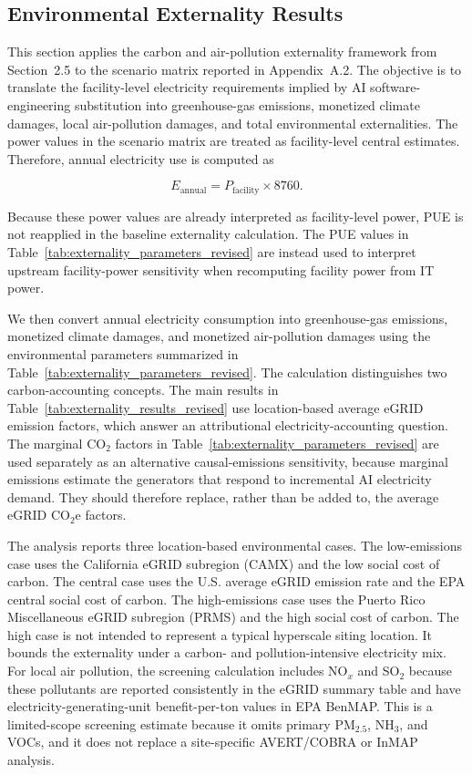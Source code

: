 \documentclass{article}
\begin{document}
\subsection{Environmental Externality Results}
\label{subsec:environmental_externality_results}

This section applies the carbon and air-pollution externality framework from Section~2.5 to the scenario matrix reported in Appendix~A.2. The objective is to translate the facility-level electricity requirements implied by AI software-engineering
substitution into greenhouse-gas emissions, monetized climate damages, local air-pollution damages, and total environmental externalities. The power values in the scenario matrix are treated as facility-level central estimates. Therefore, annual
electricity use is computed as

\begin{equation}
E_{\mathrm{annual}} = P_{\mathrm{facility}}\times 8760 .
\end{equation}

Because these power values are already interpreted as facility-level power, PUE is not reapplied in the baseline externality calculation. The PUE values in Table~\ref{tab:externality_parameters_revised} are instead used to interpret upstream facility-power sensitivity when recomputing facility power from IT power.

We then convert annual electricity consumption into greenhouse-gas emissions, monetized climate damages, and monetized air-pollution damages using the environmental parameters summarized in Table~\ref{tab:externality_parameters_revised}. The calculation distinguishes two carbon-accounting concepts. The main results in Table~\ref{tab:externality_results_revised} use location-based average eGRID emission factors, which answer an attributional electricity-accounting question. The marginal
CO$_2$ factors in Table~\ref{tab:externality_parameters_revised} are used separately as an alternative causal-emissions sensitivity, because marginal emissions estimate the generators that respond to incremental AI electricity demand. They should therefore
replace, rather than be added to, the average eGRID CO$_2$e factors.

The analysis reports three location-based environmental cases. The low-emissions case uses the California eGRID subregion (CAMX) and the low social cost of carbon. The central case uses the U.S. average eGRID emission rate and the EPA central social cost of carbon. The high-emissions case uses the Puerto Rico Miscellaneous eGRID subregion (PRMS) and the high social cost of carbon. The high case is not intended to represent a
typical hyperscale siting location. It bounds the externality under a carbon- and pollution-intensive electricity mix. For local air pollution, the screening calculation includes NO$_x$ and SO$_2$ because these pollutants are reported consistently in the eGRID summary table and have electricity-generating-unit benefit-per-ton values in EPA BenMAP. This is a limited-scope screening estimate because it omits primary PM$_{2.5}$, NH$_3$, and VOCs, and it does not replace a site-specific AVERT/COBRA or InMAP analysis.
\end{document}
